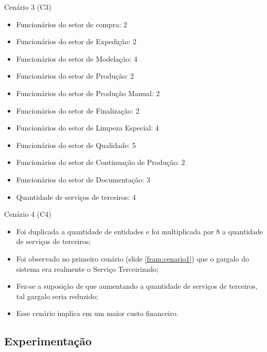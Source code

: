 \documentclass[xcolor=dvipsnames]{beamer}
\let\olditem=\item%
\renewcommand{\item}{\olditem \justifying}%
\begin{document}
\begin{frame}{Cenário 3 (C3)}
	\begin{itemize}
		\item Funcionários do setor de compra: 2
		\item Funcionários do setor de Expedição: 2
		\item Funcionários do setor de Modelação: 4
		\item Funcionários do setor de Produção: 2
		\item Funcionários do setor de Produção Manual: 2
		\item Funcionários do setor de Finalização: 2
		\item Funcionários do setor de Limpeza Especial: 4
		\item Funcionários do setor de Qualidade: 5
		\item Funcionários do setor de Continuação de Produção: 2
		\item Funcionários do setor de Documentação: 3
		\item Quantidade de serviços de terceiros: 4
	\end{itemize}
\end{frame}	

\begin{frame}{Cenário 4 (C4)}
	\label{fram:cenario4}
	\begin{itemize}
		\item Foi duplicada a quantidade de entidades e foi multiplicada por 8 a quantidade de serviços de terceiros;
		      \bigskip
		\item Foi observado no primeiro cenário (slide \ref{fram:cenario1}) que o gargalo do sistema era realmente o Serviço Terceirizado;
		      \bigskip
		\item Fez-se a suposição de que aumentando a quantidade de serviços de terceiros, tal gargalo seria reduzido;
		      \bigskip
		\item Esse cenário implica em um maior custo financeiro.
	\end{itemize}
\end{frame}	
		
\subsection{Experimentação}
	
\end{document}
